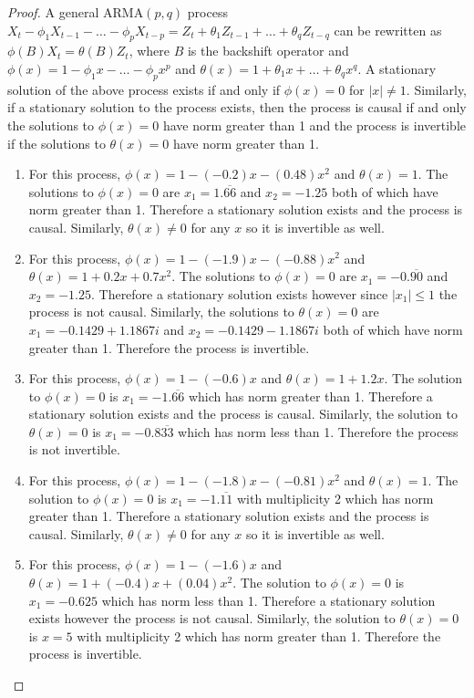 \documentclass[12pt]{article}
\theoremstyle{definition}
\begin{document}
\begin{proof}
  A general $\text{ARMA}(p, q)$ process
  $X_t - \phi_1 X_{t-1} - \dots - \phi_p X_{t-p} = Z_t + \theta_1 Z_{t-1} + \dots + \theta_q Z_{t-q}$
  can be rewritten as $\phi(B)X_t = \theta(B)Z_t$, where $B$ is the backshift
  operator and $\phi(x) = 1 - \phi_1 x - \dots - \phi_p x^p$ and
  $\theta(x) = 1 + \theta_1 x + \dots + \theta_q x^q$. A stationary solution of the
  above process exists if and only if $\phi(x) = 0$ for $|x| \ne 1$. Similarly,
  if a stationary solution to the process exists, then the process is causal
  if and only the solutions to $\phi(x) = 0$ have norm greater than 1 and the
  process is invertible if the solutions to $\theta(x) = 0$ have norm greater
  than 1.
  \begin{enumerate}
    \item For this process, $\phi(x) = 1 - (-0.2)x - (0.48)x^2$ and
      $\theta(x) = 1$. The solutions to $\phi(x) = 0$ are $x_1 = 1.\overline{66}$ and $x_2=-1.25$
      both of which have norm greater than 1. Therefore a stationary solution
      exists and the process is causal. Similarly, $\theta(x) \ne 0$ for any
      $x$ so it is invertible as well.
    \item For this process, $\phi(x) = 1 - (-1.9)x - (-0.88)x^2$ and
      $\theta(x) = 1 + 0.2x + 0.7x^2$. The solutions to $\phi(x) = 0$ are
      $x_1 = -0.\overline{90}$ and $x_2 =-1.25$. Therefore a stationary solution
      exists however since $|x_1| \leq 1$ the process is not causal. Similarly, the
      solutions to $\theta(x) = 0$ are $x_1 = -0.1429 + 1.1867i$
      and $x_2 =  -0.1429 - 1.1867i$ both of
      which have norm greater than 1. Therefore the process is invertible.
    \item For this process, $\phi(x) = 1 - (-0.6)x$ and
      $\theta(x) = 1 + 1.2x$. The solution to $\phi(x) = 0$ is
      $x_1 = -1.\overline{66}$ which has norm greater than 1. Therefore a stationary solution
      exists and the process is causal. Similarly, the
      solution to $\theta(x) = 0$ is $x_1 = -0.8\overline{33}$ which has norm
      less than 1. Therefore the process is not invertible.
    \item For this process, $\phi(x) = 1 - (-1.8)x - (-0.81)x^2$ and
      $\theta(x) = 1$. The solution to $\phi(x) = 0$ is $x_1 = -1.\overline{11}$ with multiplicity 2
      which has norm greater than 1. Therefore a stationary solution
      exists and the process is causal. Similarly, $\theta(x) \ne 0$ for any
      $x$ so it is invertible as well.
    \item For this process, $\phi(x) = 1 - (-1.6)x$ and
      $\theta(x) = 1 + (-0.4)x + (0.04)x^2$. The solution to $\phi(x) = 0$ is
      $x_1 = -0.625$ which has norm less than 1. Therefore a stationary solution
      exists however the process is not causal. Similarly, the
      solution to $\theta(x) = 0$ is $x = 5$ with multiplicity 2 which has norm
      greater than 1. Therefore the process is invertible.
  \end{enumerate}
\end{proof}
\end{document}
